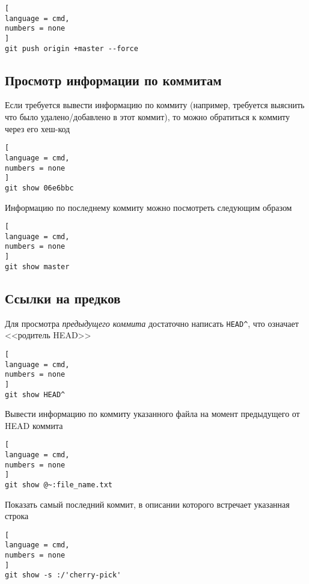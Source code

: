 \documentclass[%
	11pt,
	a4paper,
	utf8,
		]{article}
\begin{document}
\begin{lstlisting}[
language = cmd,
numbers = none
]
git push origin +master --force
\end{lstlisting}




\subsection{Просмотр информации по коммитам}

Если требуется вывести информацию по коммиту (например, требуется выяснить что было удалено/добавлено в этот коммит), то можно обратиться к коммиту через его хеш-код

\begin{lstlisting}[
language = cmd,
numbers = none
]
git show 06e6bbc
\end{lstlisting}

Информацию по последнему коммиту можно посмотреть следующим образом

\begin{lstlisting}[
language = cmd,
numbers = none
]
git show master
\end{lstlisting}

\subsection{Ссылки на предков}

Для просмотра \emph{предыдущего коммита} достаточно написать \texttt{HEAD\^}, что означает <<родитель HEAD>>

\begin{lstlisting}[
language = cmd,
numbers = none
]
git show HEAD^
\end{lstlisting}

Вывести информацию по коммиту указанного файла на момент предыдущего от HEAD коммита
\begin{lstlisting}[
language = cmd,
numbers = none
]
git show @~:file_name.txt
\end{lstlisting}

Показать самый последний коммит, в описании которого встречает указанная строка
\begin{lstlisting}[
language = cmd,
numbers = none
]
git show -s :/'cherry-pick'
\end{lstlisting}
\end{document}
